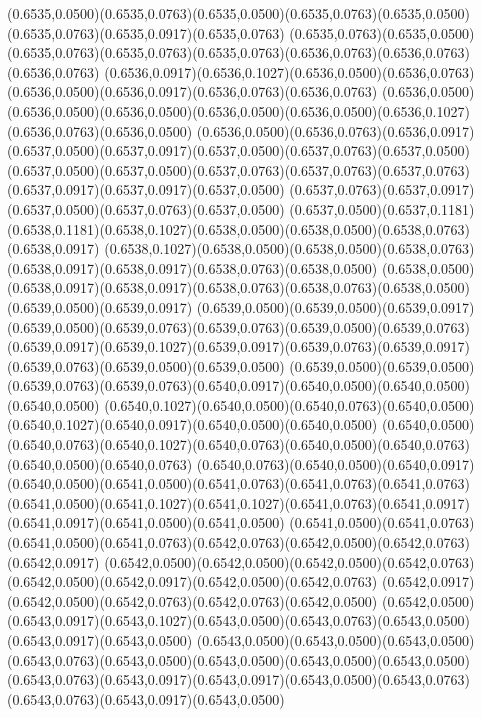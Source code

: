 (0.6535,0.0500)(0.6535,0.0763)(0.6535,0.0500)(0.6535,0.0763)(0.6535,0.0500)(0.6535,0.0763)(0.6535,0.0917)(0.6535,0.0763)
(0.6535,0.0763)(0.6535,0.0500)(0.6535,0.0763)(0.6535,0.0763)(0.6535,0.0763)(0.6536,0.0763)(0.6536,0.0763)(0.6536,0.0763)
(0.6536,0.0917)(0.6536,0.1027)(0.6536,0.0500)(0.6536,0.0763)(0.6536,0.0500)(0.6536,0.0917)(0.6536,0.0763)(0.6536,0.0763)
(0.6536,0.0500)(0.6536,0.0500)(0.6536,0.0500)(0.6536,0.0500)(0.6536,0.0500)(0.6536,0.1027)(0.6536,0.0763)(0.6536,0.0500)
(0.6536,0.0500)(0.6536,0.0763)(0.6536,0.0917)(0.6537,0.0500)(0.6537,0.0917)(0.6537,0.0500)(0.6537,0.0763)(0.6537,0.0500)
(0.6537,0.0500)(0.6537,0.0500)(0.6537,0.0763)(0.6537,0.0763)(0.6537,0.0763)(0.6537,0.0917)(0.6537,0.0917)(0.6537,0.0500)
(0.6537,0.0763)(0.6537,0.0917)(0.6537,0.0500)(0.6537,0.0763)(0.6537,0.0500)
\PST@Solid(0.6537,0.0500)(0.6537,0.1181)(0.6538,0.1181)(0.6538,0.1027)(0.6538,0.0500)(0.6538,0.0500)(0.6538,0.0763)(0.6538,0.0917)
(0.6538,0.1027)(0.6538,0.0500)(0.6538,0.0500)(0.6538,0.0763)(0.6538,0.0917)(0.6538,0.0917)(0.6538,0.0763)(0.6538,0.0500)
(0.6538,0.0500)(0.6538,0.0917)(0.6538,0.0917)(0.6538,0.0763)(0.6538,0.0763)(0.6538,0.0500)(0.6539,0.0500)(0.6539,0.0917)
(0.6539,0.0500)(0.6539,0.0500)(0.6539,0.0917)(0.6539,0.0500)(0.6539,0.0763)(0.6539,0.0763)(0.6539,0.0500)(0.6539,0.0763)
(0.6539,0.0917)(0.6539,0.1027)(0.6539,0.0917)(0.6539,0.0763)(0.6539,0.0917)(0.6539,0.0763)(0.6539,0.0500)(0.6539,0.0500)
(0.6539,0.0500)(0.6539,0.0500)(0.6539,0.0763)(0.6539,0.0763)(0.6540,0.0917)(0.6540,0.0500)(0.6540,0.0500)(0.6540,0.0500)
(0.6540,0.1027)(0.6540,0.0500)(0.6540,0.0763)(0.6540,0.0500)(0.6540,0.1027)(0.6540,0.0917)(0.6540,0.0500)(0.6540,0.0500)
(0.6540,0.0500)(0.6540,0.0763)(0.6540,0.1027)(0.6540,0.0763)(0.6540,0.0500)(0.6540,0.0763)(0.6540,0.0500)(0.6540,0.0763)
(0.6540,0.0763)(0.6540,0.0500)(0.6540,0.0917)(0.6540,0.0500)(0.6541,0.0500)(0.6541,0.0763)(0.6541,0.0763)(0.6541,0.0763)
(0.6541,0.0500)(0.6541,0.1027)(0.6541,0.1027)(0.6541,0.0763)(0.6541,0.0917)(0.6541,0.0917)(0.6541,0.0500)(0.6541,0.0500)
(0.6541,0.0500)(0.6541,0.0763)(0.6541,0.0500)(0.6541,0.0763)(0.6542,0.0763)(0.6542,0.0500)(0.6542,0.0763)(0.6542,0.0917)
(0.6542,0.0500)(0.6542,0.0500)(0.6542,0.0500)(0.6542,0.0763)(0.6542,0.0500)(0.6542,0.0917)(0.6542,0.0500)(0.6542,0.0763)
(0.6542,0.0917)(0.6542,0.0500)(0.6542,0.0763)(0.6542,0.0763)(0.6542,0.0500)
\PST@Solid(0.6542,0.0500)(0.6543,0.0917)(0.6543,0.1027)(0.6543,0.0500)(0.6543,0.0763)(0.6543,0.0500)(0.6543,0.0917)(0.6543,0.0500)
(0.6543,0.0500)(0.6543,0.0500)(0.6543,0.0500)(0.6543,0.0763)(0.6543,0.0500)(0.6543,0.0500)(0.6543,0.0500)(0.6543,0.0500)
(0.6543,0.0763)(0.6543,0.0917)(0.6543,0.0917)(0.6543,0.0500)(0.6543,0.0763)(0.6543,0.0763)(0.6543,0.0917)(0.6543,0.0500)
